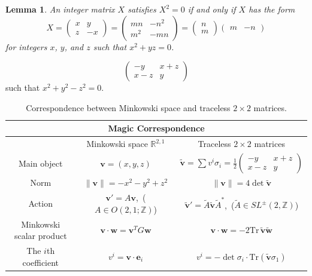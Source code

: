 \documentclass[12pt,a4paper]{amsart}
\newtheorem{lem}[thm]{Lemma}
\begin{document}
\begin{lem}
 \textit{An integer matrix $X$ satisfies $X^2 = 0$ if and only if $X$ has the form}
\[
	X 
	= \begin{pmatrix} x & y \\ z & -x \end{pmatrix}
	= \begin{pmatrix}
mn & -n^2 \\
m^2 & -mn
\end{pmatrix}
= \begin{pmatrix} n \\ m \end{pmatrix} \begin{pmatrix} m & -n 
\end{pmatrix}	
\]
\textit{for integers $x$, $y$, and $z$ such that $x^2 + yz = 0$.}
\end{lem}




$$\begin{pmatrix} -y & x+z \\ x-z & y \end{pmatrix} $$
such that $x^2 + y^2 -z^2 = 0$.



\begin{table}[h]
\renewcommand{\arraystretch}{2}
\begin{tabular}{|c|c|c|}
\hline
\multicolumn{3}{|c|}{\textbf{Magic Correspondence}} \\
\hline
 & Minkowski space $\mathbb{R}^{2,1}$ & Traceless $2 \times 2$ matrices \\
\hline
Main object & 
$\mathbf{v} = (x, y, z)$ & 
$\tilde{\mathbf{v}} = \sum v^i \sigma_i = \frac{1}{2}
\begin{pmatrix} -y & x+z \\ x-z & y \end{pmatrix}$ \\
\hline
Norm & 
$\|\mathbf{v}\| = -x^2 - y^2 + z^2$ & 
$\|\mathbf{v}\| = 4 \det \tilde{\mathbf{v}}$ \\
\hline
Action & 
$\mathbf{v}' = A\mathbf{v}$,\, \newline ($A \in O(2,1;\mathbb{Z})$) & 
$\tilde{\mathbf{v}}' = \tilde{A} \tilde{\mathbf{v}} \tilde{A}^*$,\, \newline ($\tilde{A} \in SL^{\pm}(2,\mathbb{Z})$) \\
\hline
Minkowski scalar product & 
$\mathbf{v} \cdot \mathbf{w} = \mathbf{v}^T G \mathbf{w}$ & 
$\mathbf{v} \cdot \mathbf{w} = -2 \mathrm{Tr}\,\tilde{\mathbf{v}} \tilde{\mathbf{w}}$ \\
\hline
The $i$th coefficient & 
$v^i = \mathbf{v} \cdot \mathbf{e}_i$ & 
$v^i = -\det \sigma_i \cdot \mathrm{Tr}(\tilde{\mathbf{v}} \sigma_1)$ \\
\hline
\end{tabular}
\caption{Correspondence between Minkowski space and traceless $2 \times 2$ matrices.}
\end{table}
\end{document}
